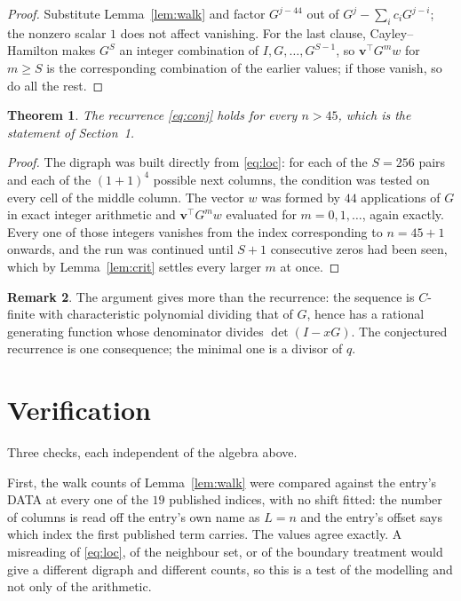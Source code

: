 \documentclass[11pt,a4paper]{article}
\theoremstyle{plain}
\newtheorem{theorem}{Theorem}
\theoremstyle{definition}
\newtheorem{remark}[theorem]{Remark}
\begin{document}
\begin{proof}
Substitute Lemma~\ref{lem:walk} and factor $G^{j-44}$ out of
$G^{j}-\sum_ic_iG^{j-i}$; the nonzero scalar $1$ does not affect
vanishing. For the last clause, Cayley--Hamilton makes $G^{S}$ an integer combination of
$I,G,\dots,G^{S-1}$, so $\mathbf{v}^{\!\top}G^{m}w$ for $m\ge S$ is the corresponding
combination of the earlier values; if those vanish, so do all the rest.
\end{proof}

\begin{theorem}
The recurrence \eqref{eq:conj} holds for every $n>45$, which is the statement of
Section~1.
\end{theorem}

\begin{proof}
The digraph was built directly from \eqref{eq:loc}: for each of the $S=256$ pairs and each
of the $(1+1)^{4}$ possible next columns, the condition was tested on every cell of
the middle column. The vector $w$ was formed by $44$ applications of $G$ in exact integer
arithmetic and $\mathbf{v}^{\!\top}G^{m}w$ evaluated for $m=0,1,\dots$, again exactly.
Every one of those integers vanishes from the index corresponding to $n=45+1$ onwards,
and the run was continued until $S+1$ consecutive zeros had been seen, which by
Lemma~\ref{lem:crit} settles every larger $m$ at once.
\end{proof}

\begin{remark}
The argument gives more than the recurrence: the sequence is $C$-finite with characteristic
polynomial dividing that of $G$, hence has a rational generating function whose denominator
divides $\det(I-xG)$. The conjectured recurrence is one consequence; the minimal one is a
divisor of $q$.
\end{remark}

\section{Verification}

Three checks, each independent of the algebra above.

First, the walk counts of Lemma~\ref{lem:walk} were compared against the entry's DATA at
every one of the $19$ published indices, with no shift fitted: the number of columns is
read off the entry's own name as $L=n$ and the entry's offset says which index the first
published term carries. The values agree exactly. A misreading of \eqref{eq:loc}, of the
neighbour set, or of the boundary treatment would give a different digraph and different
counts, so this is a test of the modelling and not only of the arithmetic.
\end{document}
